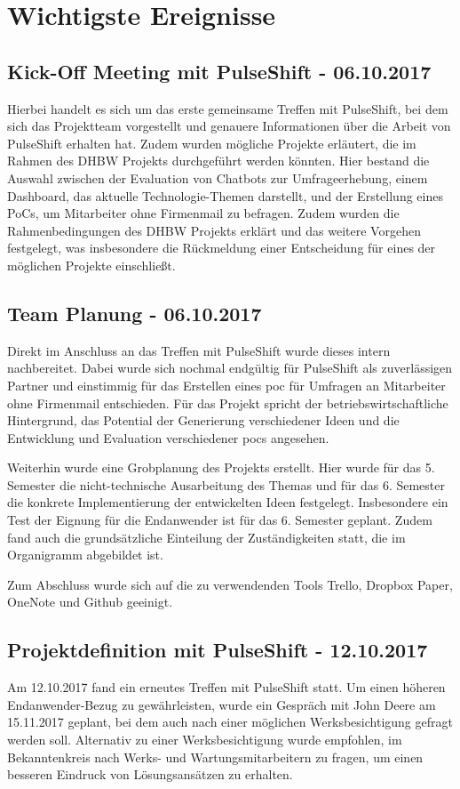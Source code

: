 \chapter{Wichtigste Ereignisse}
\section{Kick-Off Meeting mit PulseShift - 06.10.2017}
Hierbei handelt es sich um das erste gemeinsame Treffen mit PulseShift, bei dem sich das Projektteam vorgestellt und genauere Informationen über die Arbeit von PulseShift erhalten hat. Zudem wurden mögliche Projekte erläutert, die im Rahmen des DHBW Projekts durchgeführt werden könnten. Hier bestand die Auswahl zwischen der Evaluation von Chatbots zur Umfrageerhebung, einem Dashboard, das aktuelle Technologie-Themen darstellt, und der Erstellung eines PoCs, um Mitarbeiter ohne Firmenmail zu befragen. Zudem wurden die Rahmenbedingungen des DHBW Projekts erklärt und das weitere Vorgehen festgelegt, was insbesondere die Rückmeldung einer Entscheidung für eines der möglichen Projekte einschließt.

\section{Team Planung - 06.10.2017}
Direkt im Anschluss an das Treffen mit PulseShift wurde dieses intern nachbereitet. Dabei wurde sich nochmal endgültig für PulseShift als zuverlässigen Partner und einstimmig für das Erstellen eines \gls{poc} für Umfragen an Mitarbeiter ohne Firmenmail entschieden. Für das Projekt spricht der betriebswirtschaftliche Hintergrund, das Potential der Generierung verschiedener Ideen und die Entwicklung und Evaluation verschiedener \gls{poc}s angesehen.

Weiterhin wurde eine Grobplanung des Projekts erstellt. Hier wurde für das 5. Semester die nicht-technische Ausarbeitung des Themas und für das 6. Semester die konkrete Implementierung der entwickelten Ideen festgelegt. Insbesondere ein Test der Eignung für die Endanwender ist für das 6. Semester geplant. Zudem fand auch die grundsätzliche Einteilung der Zuständigkeiten statt, die im Organigramm abgebildet ist.

Zum Abschluss wurde sich auf die zu verwendenden Tools Trello, Dropbox Paper, OneNote und Github geeinigt.

\section{Projektdefinition mit PulseShift - 12.10.2017}
Am 12.10.2017 fand ein erneutes Treffen mit PulseShift statt. Um einen höheren Endanwender-Bezug zu gewährleisten, wurde ein Gespräch mit John Deere am 15.11.2017 geplant, bei dem auch nach einer möglichen Werksbesichtigung gefragt werden soll. Alternativ zu einer Werksbesichtigung wurde empfohlen, im Bekanntenkreis nach Werks- und Wartungsmitarbeitern zu fragen, um einen besseren Eindruck von Lösungsansätzen zu erhalten.

